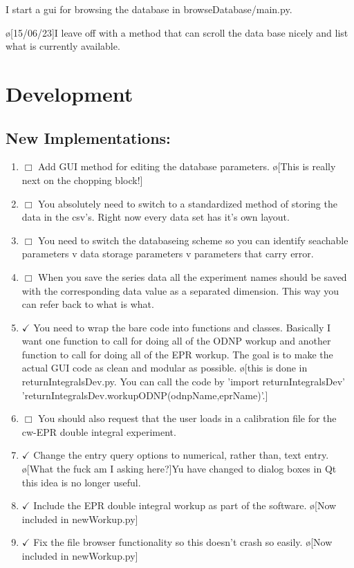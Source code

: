 \documentclass[10pt]{book}
\begin{document}
I start a gui for browsing the database in browseDatabase/main.py.

\o[15/06/23]{I leave off with a method that can scroll the data base nicely and list what is currently available.}



\chapter{Development}
\section{New Implementations:}
\begin{enumerate}
    \item $\Box$ Add GUI method for editing the database parameters. \o[This is really next on the chopping block!]
    \item $\Box$ You absolutely need to switch to a standardized method of storing the data in the csv's. Right now every data set has it's own layout.
    \item $\Box$ You need to switch the databaseing scheme so you can identify seachable parameters v data storage parameters v parameters that carry error.
    \item $\Box$ When you save the series data all the experiment names should be saved with the corresponding data value as a separated dimension. This way you can refer back to what is what.
    \item $\checkmark$ You need to wrap the bare code into functions and classes. Basically I want one function to call for doing all of the ODNP workup and another function to call for doing all of the EPR workup. The goal is to make the actual GUI code as clean and modular as possible. \o[this is done in returnIntegralsDev.py. You can call the code by 'import returnIntegralsDev' 'returnIntegralsDev.workupODNP(odnpName,eprName)'.]{}
    \item $\Box$ You should also request that the user loads in a calibration file for the cw-EPR double integral experiment.
    \item $\checkmark$ Change the entry query options to numerical, rather than, text entry. \o[What the fuck am I asking here?]{Yu have changed to dialog boxes in Qt this idea is no longer useful.}
    \item $\checkmark$ Include the EPR double integral workup as part of the software. \o[Now included in newWorkup.py]{}
    \item $\checkmark$ Fix the file browser functionality so this doesn't crash so easily. \o[Now included in newWorkup.py]{}

\end{enumerate}
\end{document}
